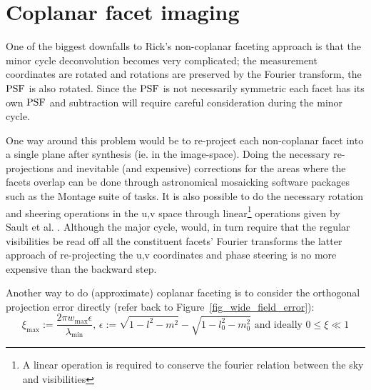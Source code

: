 \section{Coplanar facet imaging}
One of the biggest downfalls to Rick's non-coplanar faceting approach is that the minor cycle deconvolution becomes very complicated; the measurement
coordinates are rotated and rotations are preserved by the Fourier transform, the $\textrm{PSF}$ is also rotated. Since the $\textrm{PSF}$ is not necessarily 
symmetric each facet has its own $\textrm{PSF}$ and subtraction will require careful consideration during the minor cycle.

One way around this problem would be to re-project each non-coplanar facet into a single plane after synthesis (ie. in the image-space). Doing the necessary
re-projections and inevitable (and expensive) corrections for the areas where the facets overlap can be done through astronomical mosaicking software packages such as the
Montage \cite{jacob2004montage} suite of tasks. It is also possible to do the necessary rotation and sheering operations in the u,v space through 
linear\footnote{A linear operation is required to conserve the fourier relation between the sky and visibilities} operations given by 
Sault et al. \cite[Appendix A]{sault1996approach}. Although the major cycle, would, in turn require that the regular visibilities be read off all
the constituent facets' Fourier transforms the latter approach of re-projecting the u,v coordinates and phase steering is no more expensive than the backward 
step.

Another way to do (approximate) coplanar faceting is to consider the orthogonal projection error directly (refer back to Figure~\ref{fig_wide_field_error}):
\begin{equation}
\xi_{\text{max}}:=\frac{2{\pi}w_{\text{max}}\epsilon}{{\lambda_{\text{min}}}} \text{, }\epsilon:=\sqrt{1-l^2-m^2} - \sqrt{1-l_0^2-m_0^2} \text{ and ideally } 0{\leq\xi\ll}1
\end{equation}

